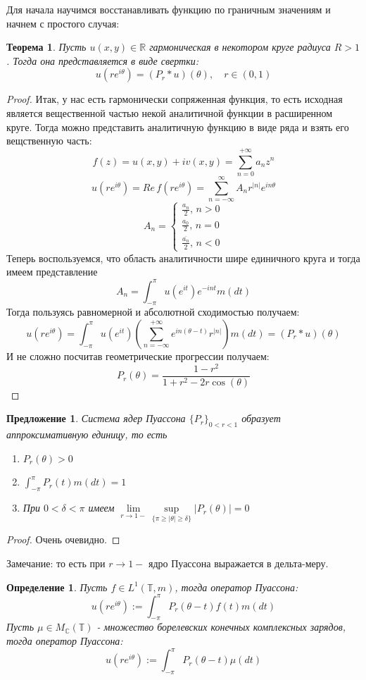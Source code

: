\documentclass[12pt,a4paper]{article} %
\newtheorem{theorem}{Теорема}
\newtheorem{definition}{Определение}
\newtheorem{proposition}{Предложение}
\newcommand{\R}{\mathbb{R}}
\newcommand{\Co}{\mathbb{C}}
\newcommand{\T}{\mathbb{T}}
\begin{document}
	Для начала научимся восстанавливать функцию по граничным значениям и начнем с простого случая:
	\begin{theorem}
		Пусть $u(x,y)\in\R$ гармоническая в некотором круге радиуса $R>1$. Тогда она представляется в виде свертки:
		$$u(re^{i\theta})=(P_r*u)(\theta),\quad r\in(0,1)$$
	\end{theorem}
	\begin{proof}
		Итак, у нас есть гармонически сопряженная функция, то есть исходная является вещественной частью некой аналитичной функции в расширенном круге. Тогда можно представить аналитичную функцию в виде ряда и взять его вещственную часть:
		$$f(z)=u(x,y)+iv(x,y)=\sum_{n=0}^{+\infty}a_nz^n$$
		$$u(re^{i\theta})=Re\,f(re^{i\theta})=\sum_{n=-\infty}^{\infty}A_nr^{|n|}e^{in\theta}$$
		$$
		A_n=
		\begin{cases}
		\frac{a_n}{2},\,n>0 \\
		\frac{a_0}{2},\,n=0 \\
		\frac{\overline{a_n}}{2},\,n<0
		\end{cases}
		$$
		Теперь воспользуемся, что область аналитичности шире единичного круга и тогда имеем представление
		$$A_n=\int_{-\pi}^{\pi}u(e^{it})e^{-int}m(dt)$$
		Тогда пользуясь равномерной и абсолютной сходимостью получаем:
		$$u(re^{i\theta})=\int_{-\pi}^{\pi}u(e^{it})\left(\sum_{n=-\infty}^{+\infty}e^{in(\theta-t)}r^{|n|}\right)m(dt)=(P_r*u)(\theta)$$
		И не сложно посчитав геометрические прогрессии получаем:
		$$P_r(\theta)=\frac{1-r^2}{1+r^2-2r\cos(\theta)}$$
	\end{proof}
	\begin{proposition}
		Система ядер Пуассона $\{P_r\}_{0<r<1}$ образует аппроксимативную единицу, то есть
		\begin{enumerate}
			\item $P_r(\theta)>0$
			\item $\displaystyle\int_{-\pi}^{\pi}P_r(t)m(dt)=1$
			\item При $0<\delta<\pi$ имеем $\lim\limits_{r\rightarrow1-}\sup\limits_{\{\pi\geq|\theta|\geq\delta\}}|P_r(\theta)|=0$
		\end{enumerate}
	\end{proposition}
	\begin{proof}
		Очень очевидно.
	\end{proof}
	Замечание: то есть при $r\rightarrow1-$ ядро Пуассона выражается в дельта-меру.
	\begin{definition}
		Пусть $f\in L^1(\T,m)$, тогда оператор Пуассона:
		$$u(re^{i\theta}):=\int_{-\pi}^{\pi}P_r(\theta-t)f(t)m(dt)$$
		Пусть $\mu\in M_{\Co}(\T)$ - множество борелевских конечных комплексных зарядов, тогда оператор Пуассона:
		$$u(re^{i\theta}):=\int_{-\pi}^{\pi}P_r(\theta-t)\mu(dt)$$
	\end{definition}
\end{document}
